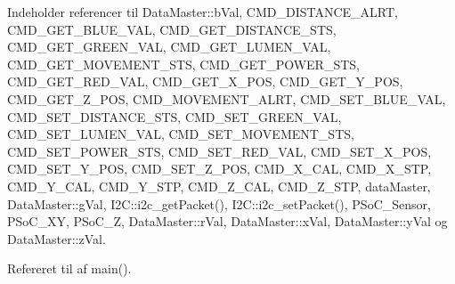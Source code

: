Indeholder referencer til Data\+Master\+::b\+Val, C\+M\+D\+\_\+\+D\+I\+S\+T\+A\+N\+C\+E\+\_\+\+A\+L\+RT, C\+M\+D\+\_\+\+G\+E\+T\+\_\+\+B\+L\+U\+E\+\_\+\+V\+AL, C\+M\+D\+\_\+\+G\+E\+T\+\_\+\+D\+I\+S\+T\+A\+N\+C\+E\+\_\+\+S\+TS, C\+M\+D\+\_\+\+G\+E\+T\+\_\+\+G\+R\+E\+E\+N\+\_\+\+V\+AL, C\+M\+D\+\_\+\+G\+E\+T\+\_\+\+L\+U\+M\+E\+N\+\_\+\+V\+AL, C\+M\+D\+\_\+\+G\+E\+T\+\_\+\+M\+O\+V\+E\+M\+E\+N\+T\+\_\+\+S\+TS, C\+M\+D\+\_\+\+G\+E\+T\+\_\+\+P\+O\+W\+E\+R\+\_\+\+S\+TS, C\+M\+D\+\_\+\+G\+E\+T\+\_\+\+R\+E\+D\+\_\+\+V\+AL, C\+M\+D\+\_\+\+G\+E\+T\+\_\+\+X\+\_\+\+P\+OS, C\+M\+D\+\_\+\+G\+E\+T\+\_\+\+Y\+\_\+\+P\+OS, C\+M\+D\+\_\+\+G\+E\+T\+\_\+\+Z\+\_\+\+P\+OS, C\+M\+D\+\_\+\+M\+O\+V\+E\+M\+E\+N\+T\+\_\+\+A\+L\+RT, C\+M\+D\+\_\+\+S\+E\+T\+\_\+\+B\+L\+U\+E\+\_\+\+V\+AL, C\+M\+D\+\_\+\+S\+E\+T\+\_\+\+D\+I\+S\+T\+A\+N\+C\+E\+\_\+\+S\+TS, C\+M\+D\+\_\+\+S\+E\+T\+\_\+\+G\+R\+E\+E\+N\+\_\+\+V\+AL, C\+M\+D\+\_\+\+S\+E\+T\+\_\+\+L\+U\+M\+E\+N\+\_\+\+V\+AL, C\+M\+D\+\_\+\+S\+E\+T\+\_\+\+M\+O\+V\+E\+M\+E\+N\+T\+\_\+\+S\+TS, C\+M\+D\+\_\+\+S\+E\+T\+\_\+\+P\+O\+W\+E\+R\+\_\+\+S\+TS, C\+M\+D\+\_\+\+S\+E\+T\+\_\+\+R\+E\+D\+\_\+\+V\+AL, C\+M\+D\+\_\+\+S\+E\+T\+\_\+\+X\+\_\+\+P\+OS, C\+M\+D\+\_\+\+S\+E\+T\+\_\+\+Y\+\_\+\+P\+OS, C\+M\+D\+\_\+\+S\+E\+T\+\_\+\+Z\+\_\+\+P\+OS, C\+M\+D\+\_\+\+X\+\_\+\+C\+AL, C\+M\+D\+\_\+\+X\+\_\+\+S\+TP, C\+M\+D\+\_\+\+Y\+\_\+\+C\+AL, C\+M\+D\+\_\+\+Y\+\_\+\+S\+TP, C\+M\+D\+\_\+\+Z\+\_\+\+C\+AL, C\+M\+D\+\_\+\+Z\+\_\+\+S\+TP, data\+Master, Data\+Master\+::g\+Val, I2\+C\+::i2c\+\_\+get\+Packet(), I2\+C\+::i2c\+\_\+set\+Packet(), P\+So\+C\+\_\+\+Sensor, P\+So\+C\+\_\+\+XY, P\+So\+C\+\_\+Z, Data\+Master\+::r\+Val, Data\+Master\+::x\+Val, Data\+Master\+::y\+Val og Data\+Master\+::z\+Val.



Refereret til af main().


